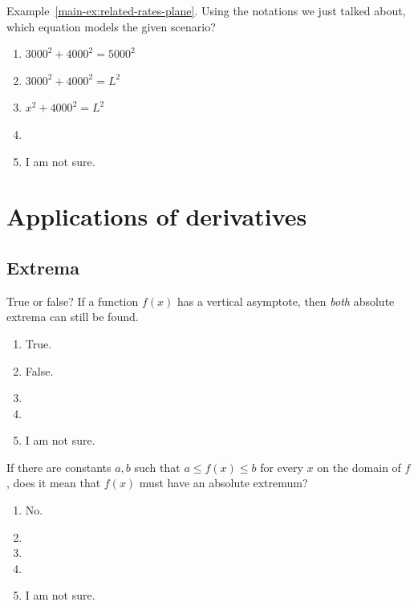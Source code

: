 \documentclass[aspectratio=169, 14pt, t]{beamer}  %
\begin{document}
\begin{poll}
  Example~\ref{main-ex:related-rates-plane}. Using the notations we just talked about, which equation models the given scenario?

  \begin{enumerate}
    \item \(3000^{2} + 4000^{2} = 5000^{2}\)
    \item \(3000^{2} + 4000^{2} = L^{2}\)
    \item \(x^{2} + 4000^{2} = L^{2}\)
    \item 
    \item I am not sure.
  \end{enumerate}
\end{poll}

\section{Applications of derivatives}

\subsection{Extrema}

\begin{poll}
  True or false? If a function \(f(x)\) has a vertical asymptote, then \emph{both} absolute extrema can still be found.

  \begin{enumerate}
    \item True.
    \item False.
    \item
    \item
    \item I am not sure.
  \end{enumerate}
\end{poll}

\begin{poll}
  If there are constants \(a,b\) such that \(a \le f(x) \le b\) for every \(x\) on the domain of \(f\), does it mean that \(f(x)\) must have an absolute extremum?

  \begin{enumerate}
    \item No.
    \item {} 
    \item
    \item
    \item I am not sure.
  \end{enumerate}
\end{poll}
\end{document}
